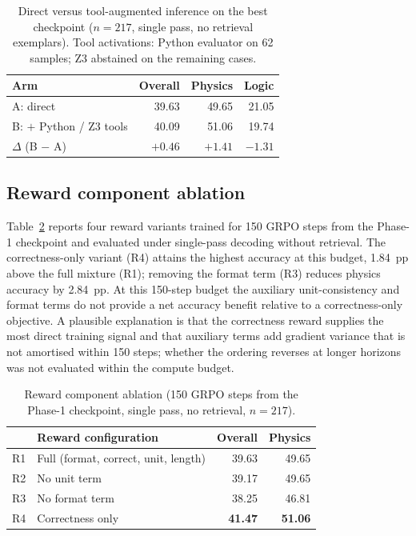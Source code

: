 \documentclass[APA,twocolumn]{USG}
\begin{document}
\begin{table}[t]
\centering
\caption{Direct versus tool-augmented inference on the best checkpoint
($n=217$, single pass, no retrieval exemplars). Tool activations: Python
evaluator on 62 samples; Z3 abstained on the remaining cases.\label{tab7}}
\begin{tabular*}{\columnwidth}{@{\extracolsep\fill}lrrr@{\extracolsep\fill}}
\toprule
\textbf{Arm} & \textbf{Overall} & \textbf{Physics} & \textbf{Logic} \\
\midrule
A: direct & 39.63 & 49.65 & 21.05 \\
B: $+$ Python / Z3 tools & 40.09 & 51.06 & 19.74 \\
\midrule
$\Delta$ (B $-$ A) & $+0.46$ & $+1.41$ & $-1.31$ \\
\bottomrule
\end{tabular*}
\end{table}

\subsection{Reward component ablation}
Table~\ref{tab8} reports four reward variants trained for 150 GRPO steps from the
Phase-1 checkpoint and evaluated under single-pass decoding without retrieval.
The correctness-only variant (R4) attains the highest accuracy at this budget,
1.84~pp above the full mixture (R1); removing the format term (R3) reduces
physics accuracy by 2.84~pp. At this 150-step budget the auxiliary
unit-consistency and format terms do not provide a net accuracy benefit relative
to a correctness-only objective. A plausible explanation is that the correctness
reward supplies the most direct training signal and that auxiliary terms add
gradient variance that is not amortised within 150 steps; whether the ordering
reverses at longer horizons was not evaluated within the compute budget.

\begin{table}[t]
\centering
\caption{Reward component ablation (150 GRPO steps from the Phase-1 checkpoint,
single pass, no retrieval, $n=217$).\label{tab8}}
\begin{tabular*}{\columnwidth}{@{\extracolsep\fill}llrr@{\extracolsep\fill}}
\toprule
& \textbf{Reward configuration} & \textbf{Overall} & \textbf{Physics} \\
\midrule
R1 & Full (format, correct, unit, length) & 39.63 & 49.65 \\
R2 & No unit term & 39.17 & 49.65 \\
R3 & No format term & 38.25 & 46.81 \\
R4 & Correctness only & \textbf{41.47} & \textbf{51.06} \\
\bottomrule
\end{tabular*}
\end{table}
\end{document}
